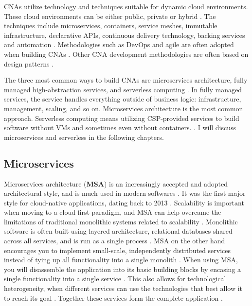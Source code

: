 \documentclass[utf8,english]{gradu3}
\begin{document}
CNAs utilize technology and techniques suitable for dynamic cloud environments.
These cloud environments can be either public, private or hybrid
\parencite{CNAF2018}. The techniques include microservices, containers, service
meshes, immutable infrastructure, declarative APIs, continuous delivery
technology, backing services and automation \parencite{CNAF2018, Patrizio2018,
  Microsoft2022-CNA}. Methodologies such as DevOps and agile are often adopted when
building CNAs \parencite{Patrizio2018}. Other CNA development methodologies are
often based on design patterns \parencite{Kratzke2017}.

The three most common ways to build CNAs are microservices architecture, fully
managed high-abstraction services, and serverless computing
\parencite[17]{Gannon2017}. In fully managed services, the service handles
everything outside of business logic: infrastructure, management, scaling, and
so on. Microservices architecture is the most common approach. Serverless
computing means utilizing CSP-provided services to build software without
VMs and sometimes even without containers.
\parencite[17]{Gannon2017}. I will discuss microservices and serverless in the
following chapters.


\subsection{Microservices}

Microservices architecture (\textbf{MSA}) is an increasingly accepted and
adopted architectural style, and is much used in modern softwares
\parencite[10]{Vale2022}. It was the first major style for cloud-native
applications, dating back to 2013 \parencite[18]{Gannon2017}. Scalability is
important when moving to a cloud-first paradigm, and MSA can help overcame the
limitations of traditional monolithic systems related to scalability
\parencite[10]{Vale2022}. Monolithic software is often built using layered
architecture, relational databases shared across all services, and is run as a
single process \parencite{Microsoft2022-CNA}. MSA on the other hand encourages you
to implement small-scale, independently distributed services instead of tying up
all functionality into a single monolith \parencite[1]{Li2021}. When using MSA,
you will disassemble the application into its basic building blocks by encasing
a single functionality into a single service \parencite[18]{Gannon2017}. This
also allows for technological heterogeneity, when different services can use the
technologies that best allow it to reach its goal \parencite[18]{Li2021}.
Together these services form the complete application \parencite{Microsoft2022-CNA}.
\end{document}
